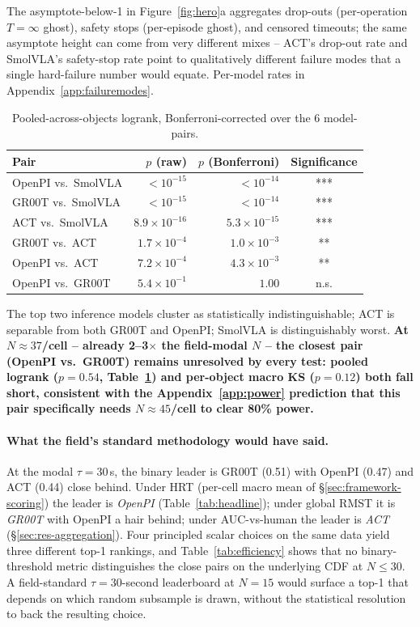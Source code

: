 \documentclass{article}
\begin{document}
The asymptote-below-1 in Figure~\ref{fig:hero}a aggregates drop-outs (per-operation $T{=}\infty$ ghost), safety stops (per-episode ghost), and censored timeouts; the same asymptote height can come from very different mixes -- ACT's drop-out rate and SmolVLA's safety-stop rate point to qualitatively different failure modes that a single hard-failure number would equate. Per-model rates in Appendix~\ref{app:failuremodes}.

\begin{table}[h]
\centering
\begin{tabular}{lrrc}
\toprule
Pair & $p$ (raw) & $p$ (Bonferroni) & Significance \\
\midrule
OpenPI vs.\ SmolVLA & ${<}10^{-15}$ & ${<}10^{-14}$ & *** \\
GR00T vs.\ SmolVLA & ${<}10^{-15}$ & ${<}10^{-14}$ & *** \\
ACT vs.\ SmolVLA & $8.9 \times 10^{-16}$ & $5.3 \times 10^{-15}$ & *** \\
GR00T vs.\ ACT & $1.7 \times 10^{-4}$ & $1.0 \times 10^{-3}$ & ** \\
OpenPI vs.\ ACT & $7.2 \times 10^{-4}$ & $4.3 \times 10^{-3}$ & ** \\
OpenPI vs.\ GR00T & $5.4 \times 10^{-1}$ & $1.00$ & n.s. \\
\bottomrule
\end{tabular}
\caption{Pooled-across-objects logrank, Bonferroni-corrected over the 6 model-pairs.}
\label{tab:pairs}
\end{table}

The top two inference models cluster as statistically indistinguishable; ACT is separable from both GR00T and OpenPI; SmolVLA is distinguishably worst. \textbf{At $N \approx 37$/cell -- already 2--3$\times$ the field-modal $N$ -- the closest pair (OpenPI vs.\ GR00T) remains unresolved by every test: pooled logrank ($p = 0.54$, Table~\ref{tab:pairs}) and per-object macro KS ($p = 0.12$) both fall short, consistent with the Appendix~\ref{app:power} prediction that this pair specifically needs $N \approx 45$/cell to clear 80\% power.}

\paragraph{What the field's standard methodology would have said.} At the modal $\tau{=}30$\,s, the binary leader is GR00T (0.51) with OpenPI (0.47) and ACT (0.44) close behind. Under HRT (per-cell macro mean of \S\ref{sec:framework-scoring}) the leader is \emph{OpenPI} (Table~\ref{tab:headline}); under global RMST it is \emph{GR00T} with OpenPI a hair behind; under AUC-vs-human the leader is \emph{ACT} (\S\ref{sec:res-aggregation}). Four principled scalar choices on the same data yield three different top-1 rankings, and Table~\ref{tab:efficiency} shows that no binary-threshold metric distinguishes the close pairs on the underlying CDF at $N \le 30$. A field-standard $\tau{=}30$-second leaderboard at $N{=}15$ would surface a top-1 that depends on which random subsample is drawn, without the statistical resolution to back the resulting choice.
\end{document}
